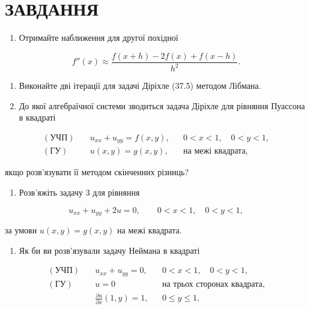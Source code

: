 \documentclass[
  ukrainian,
]{article}
\providecommand{\tightlist}{%
  \setlength{\itemsep}{0pt}\setlength{\parskip}{0pt}}
\begin{document}
\section{ЗАВДАННЯ}\label{ux437ux430ux432ux434ux430ux43dux43dux44f-20}

\begin{enumerate}
\def\labelenumi{\arabic{enumi}.}
\tightlist
\item
  Отримайте наближення для другої похідної
\end{enumerate}

\[f''(x)\approx \frac{f(x+h)-2f(x)+f(x-h)}{h^2}.\]

\begin{enumerate}
\def\labelenumi{\arabic{enumi}.}
\setcounter{enumi}{1}
\item
  Виконайте дві ітерації для задачі Діріхле (37.5) методом Лібмана.
\item
  До якої алгебраїчної системи зводиться задача Діріхле для рівняння
  Пуассона в квадраті
\end{enumerate}

\[\begin{aligned}(\text{УЧП})\quad & u_{xx}+u_{yy}=f(x,y), && 0<x<1,\quad 0<y<1,\\(\text{ГУ})\quad & u(x,y)=g(x,y), && \text{на межі квадрата},\end{aligned}\]

якщо розв'язувати її методом скінченних різниць?

\begin{enumerate}
\def\labelenumi{\arabic{enumi}.}
\setcounter{enumi}{3}
\tightlist
\item
  Розв'яжіть задачу 3 для рівняння
\end{enumerate}

\[u_{xx}+u_{yy}+2u=0,\qquad 0<x<1,\quad 0<y<1,\]

за умови \(u(x,y)=g(x,y)\) на межі квадрата.

\begin{enumerate}
\def\labelenumi{\arabic{enumi}.}
\setcounter{enumi}{4}
\tightlist
\item
  Як би ви розв'язували задачу Неймана в квадраті
\end{enumerate}

\[\begin{aligned}(\text{УЧП})\quad & u_{xx}+u_{yy}=0, && 0<x<1,\quad 0<y<1,\\(\text{ГУ})\quad & u=0 && \text{на трьох сторонах квадрата},\\& \frac{\partial u}{\partial x}(1,y)=1, && 0\le y\le 1,\end{aligned}\]
\end{document}
